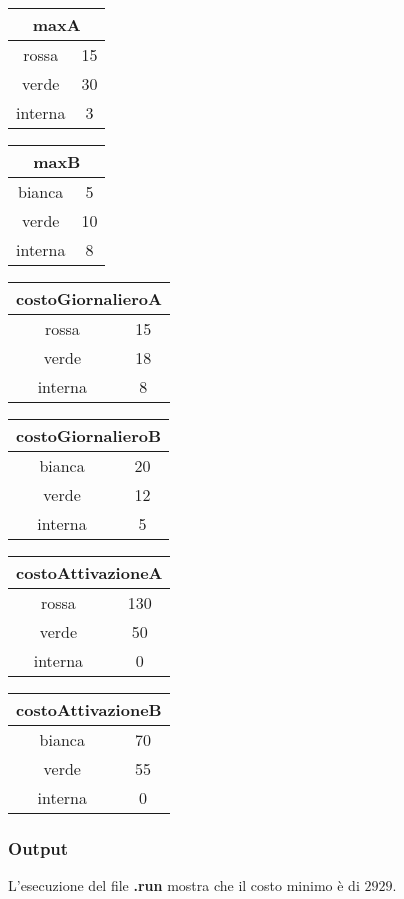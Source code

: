 \begin{tabular}{| c | c |}
    \hline
    \multicolumn{2}{|c|}{maxA}\\
    \hline \hline
    rossa & 15 \\
    verde & 30 \\
    interna & 3 \\
    \hline    
\end{tabular}
\begin{tabular}{| c | c |}
    \hline
    \multicolumn{2}{|c|}{maxB} \\
    \hline \hline
    bianca & 5 \\
    verde & 10 \\
    interna & 8 \\
    \hline    
\end{tabular}
\begin{tabular}{| c | c |}
    \hline
    \multicolumn{2}{|c|}{costoGiornalieroA}\\
    \hline \hline
    rossa & 15 \\
    verde & 18 \\
    interna & 8 \\
    \hline    
\end{tabular}
\begin{tabular}{| c | c |}
    \hline
    \multicolumn{2}{|c|}{costoGiornalieroB} \\
    \hline \hline
    bianca & 20 \\
    verde & 12 \\
    interna & 5 \\
    \hline    
\end{tabular}
\begin{tabular}{| c | c |}
    \hline
    \multicolumn{2}{|c|}{costoAttivazioneA}\\
    \hline \hline
    rossa & 130 \\
    verde & 50 \\
    interna & 0 \\
    \hline    
\end{tabular}
\begin{tabular}{| c | c |}
    \hline
    \multicolumn{2}{|c|}{costoAttivazioneB} \\
    \hline \hline
    bianca & 70 \\
    verde & 55 \\
    interna & 0 \\
    \hline    
\end{tabular}


\subsubsection{Output}
L'esecuzione del file \textbf{.run} mostra che il costo minimo è di \texteuro$2929$.

